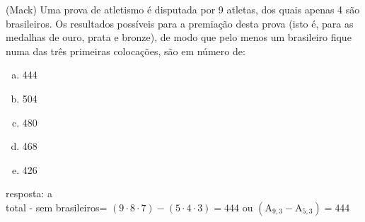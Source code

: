 \begin{ex}
 (Mack) Uma prova de atletismo é disputada por 9 atletas, dos quais apenas 4 são brasileiros. Os resultados possíveis para a premiação desta prova (isto é, para as medalhas de ouro, prata e bronze), de modo que pelo menos um brasileiro fique numa das três primeiras colocações, são em número de:
    \begin{enumerate}[(a)]
    \item 444
    \item 504
    \item 480
    \item 468
    \item 426
    \end{enumerate}
      \begin{sol}
        resposta: a \\
        total - sem brasileiros= $(9\cdot8\cdot7) - (5\cdot4\cdot3)=444$  ou $(\mathrm{A}_{9,3} - \mathrm{A}_{5,3})=444$
      \end{sol}
\end{ex}